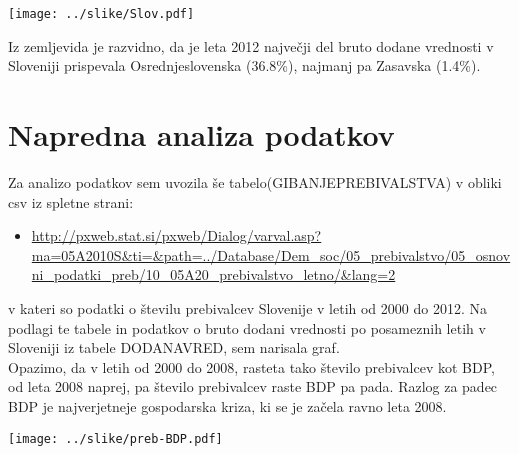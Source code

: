 \documentclass[a4paper, 11pt]{article}
\begin{document}
\newpage
\begin{center}
\texttt{[image: ../slike/Slov.pdf]}
\end{center}

Iz zemljevida je razvidno, da je leta 2012 največji del bruto dodane vrednosti v Sloveniji prispevala Osrednjeslovenska (36.8\%), najmanj pa Zasavska (1.4\%).


\section{Napredna analiza podatkov}
Za analizo podatkov sem uvozila še tabelo(GIBANJEPREBIVALSTVA) v obliki csv iz spletne strani:
\begin{itemize}
\item{\url{http://pxweb.stat.si/pxweb/Dialog/varval.asp?ma=05A2010S&ti=&path=../Database/Dem_soc/05_prebivalstvo/05_osnovni_podatki_preb/10_05A20_prebivalstvo_letno/&lang=2}}
\end{itemize}
v kateri so podatki o številu prebivalcev Slovenije v letih od 2000 do 2012.
Na podlagi te tabele in podatkov o bruto dodani vrednosti po posameznih letih v Sloveniji iz tabele DODANAVRED, sem narisala graf. \\

Opazimo, da v letih od 2000 do 2008, rasteta tako število prebivalcev kot BDP, od leta 2008 naprej, pa število prebivalcev raste BDP pa pada. Razlog za padec BDP je najverjetneje gospodarska kriza, ki se je začela ravno leta 2008.

\texttt{[image: ../slike/preb-BDP.pdf]}
\end{document}
